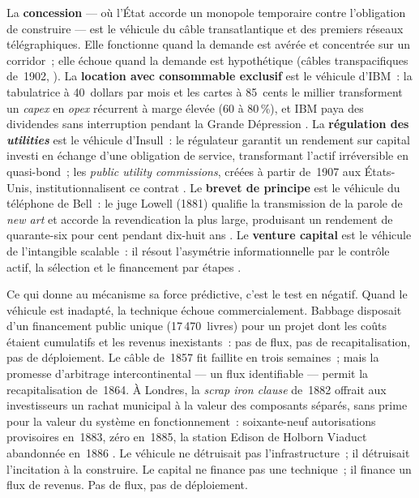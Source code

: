 La \textbf{concession} --- où l'État accorde un monopole temporaire contre l'obligation de construire --- est le véhicule du câble transatlantique et des premiers réseaux télégraphiques. Elle fonctionne quand la demande est avérée et concentrée sur un corridor~; elle échoue quand la demande est hypothétique (câbles transpacifiques de~1902, \textcite{muller_telegraph_2015}). La \textbf{location avec consommable exclusif} est le véhicule d'IBM~: la tabulatrice à 40~dollars par mois et les cartes à 85~cents le millier transforment un \emph{capex} en \emph{opex} récurrent à marge élevée (60 à 80\,\%), et IBM paya des dividendes sans interruption pendant la Grande Dépression \parencite{cortada_before_1993}. La \textbf{régulation des \emph{utilities}} est le véhicule d'Insull~: le régulateur garantit un rendement sur capital investi en échange d'une obligation de service, transformant l'actif irréversible en quasi-bond~; les \emph{public utility commissions}, créées à partir de~1907 aux États-Unis, institutionnalisent ce contrat \parencite{hughes_networks_1983}. Le \textbf{brevet de principe} est le véhicule du téléphone de Bell~: le juge Lowell (1881) qualifie la transmission de la parole de \og \emph{new art}\fg{} et accorde la revendication la plus large, produisant un rendement de quarante-six pour cent pendant dix-huit ans \parencite{gabel_early_1969}. Le \textbf{venture capital} est le véhicule de l'intangible scalable~: il résout l'asymétrie informationnelle par le contrôle actif, la sélection et le financement par étapes \parencite{hall_financing_2010}.

Ce qui donne au mécanisme sa force prédictive, c'est le test en négatif. Quand le véhicule est inadapté, la technique échoue commercialement. Babbage disposait d'un financement public unique (17\,470~livres) pour un projet dont les coûts étaient cumulatifs et les revenus inexistants~: pas de flux, pas de recapitalisation, pas de déploiement. Le câble de~1857 fit faillite en trois semaines~; mais la promesse d'arbitrage intercontinental --- un flux identifiable --- permit la recapitalisation de~1864. À Londres, la \emph{scrap iron clause} de~1882 offrait aux investisseurs un rachat municipal à la valeur des composants séparés, sans prime pour la valeur du système en fonctionnement~: soixante-neuf autorisations provisoires en~1883, zéro en~1885, la station Edison de Holborn Viaduct abandonnée en~1886 \parencite{hughes_networks_1983}. Le véhicule ne détruisait pas l'infrastructure~; il détruisait l'incitation à la construire. Le capital ne finance pas une technique~; il finance un flux de revenus. Pas de flux, pas de déploiement.



